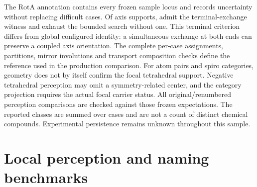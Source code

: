 \documentclass[pdflatex,sn-mathphys-num,referee,lineno]{sn-jnl}
\theoremstyle{plain}
\theoremstyle{remark}
\theoremstyle{definition}
\begin{document}
The RotA annotation contains every frozen sample locus and records uncertainty
without replacing difficult cases. Of \ChemicalRotAAxisSupports{} axis
supports, \ChemicalRotATerminalRelatedAxes{} admit the terminal-exchange
witness and \ChemicalRotATerminalConfirmedAxes{} exhaust the bounded search
without one. This terminal criterion differs from global configured identity:
a simultaneous exchange at both ends can preserve a coupled axis orientation.
The complete per-case assignments, partitions, mirror involutions and
transport composition checks define the reference used in the production
comparison. For atom pairs and spiro categories, geometry does not by itself
confirm the focal tetrahedral support. Negative tetrahedral perception may
omit a symmetry-related center, and the category projection requires the
actual focal carrier status. All \ChemicalRotAPerceptionComputations{}
original/renumbered perception comparisons are checked against those frozen
expectations. The \ChemicalRotASumPerCaseClasses{} reported classes are
summed over cases and are not a count of distinct chemical compounds.
Experimental persistence remains unknown throughout this sample.

\section{Local perception and naming benchmarks}
\end{document}
